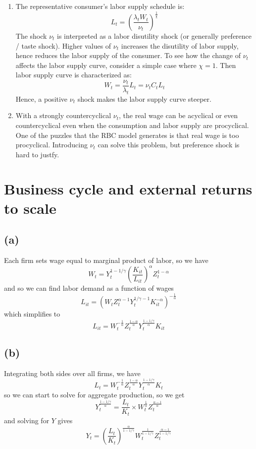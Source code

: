 \documentclass[11pt]{amsart}
\begin{document}
\begin{enumerate}[label=(\alph*)]
	\item The representative consumer's labor supply schedule is: 
	\begin{equation*}
	L_t = \left( \frac{\lambda_t W_t}{\nu_t} \right)^{\frac{1}{\chi}}
	\end{equation*}
	The shock $\nu_t$ is interpreted as a labor disutility shock (or generally preference / taste shock). Higher values of $\nu_t$ increases the disutility of labor supply, hence reduces the labor supply of the consumer. To see how the change of $\nu_t$ affects the labor supply curve, consider a simple case where $\chi = 1$. Then labor supply curve is characterized as: 
	\begin{equation*}
	W_t = \frac{\nu_t}{\lambda_t} L_t = \nu_t C_t L_t  
	\end{equation*}
	Hence, a positive $\nu_t$ shock makes the labor supply curve steeper. 
	
	\item With a strongly countercyclical $\nu_t$, the real wage can be acyclical or even countercyclical even when the consumption and labor supply are procyclical. One of the puzzles that the RBC model generates is that real wage is too procyclical. Introducing $\nu_t$ can solve this problem, but preference shock is hard to justfy.  
\end{enumerate}

\section{Business cycle and external returns to scale}
\subsection*{(a)}

Each firm sets wage equal to marginal product of labor, so we have
\[
W_t = Y_t^{1-1/\gamma} \left(\frac{K_{it}}{L_{it}}\right)^{\alpha} Z_t^{1-\alpha}
\]
and so we can find labor demand as a function of wages
\[
L_{it} = (W_t Z_t^{\alpha-1} Y_t^{1/\gamma -1} K_{it}^{-\alpha})^{-\frac{1}{\alpha}}
\]
which simplifies to
\[
L_{it} = W_t^{-\frac{1}{\alpha}} Z_t^{\frac{1-\alpha}{\alpha}} Y_t^{\frac{1-1/\gamma}{\alpha}} K_{it}
\]

\subsection*{(b)}

Integrating both sides over all firms, we have
\[
L_t = W_t^{-\frac{1}{\alpha}} Z_t^{\frac{1-\alpha}{\alpha}} Y_t^{\frac{1-1/\gamma}{\alpha}} K_t
\]
so we can start to solve for aggregate production, so we get
\[
Y_t^{\frac{1-1/\gamma}{\alpha}} = \frac{L_t}{K_t} \times W_t^{\frac{1}{\alpha}} Z_t^{\frac{\alpha - 1}{\alpha}}
\]
and solving for $Y$ gives
\[
Y_t = \left(\frac{L_t}{K_t} \right)^{\frac{\alpha}{1-1/\gamma}} W_t^{\frac{1}{1-1/\gamma}} Z_t^{\frac{\alpha - 1}{1-1/\gamma}}
\]
\end{document}
